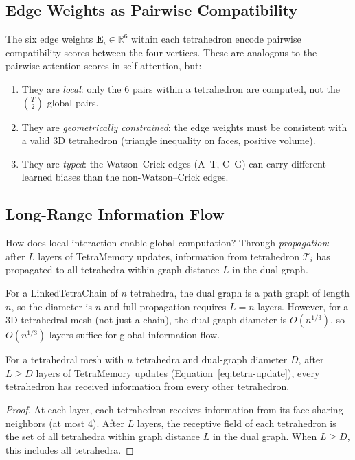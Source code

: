 \subsection{Edge Weights as Pairwise Compatibility}
\label{sec:edge-compatibility}

The six edge weights $\mathbf{E}_i \in \mathbb{R}^6$ within each tetrahedron
encode pairwise compatibility scores between the four vertices. These are
analogous to the pairwise attention scores in self-attention, but:

\begin{enumerate}[leftmargin=2em]
  \item They are \emph{local}: only the 6 pairs within a tetrahedron are
        computed, not the $\binom{T}{2}$ global pairs.
  \item They are \emph{geometrically constrained}: the edge weights must be
        consistent with a valid 3D tetrahedron (triangle inequality on faces,
        positive volume).
  \item They are \emph{typed}: the Watson--Crick edges (A--T, C--G) can carry
        different learned biases than the non-Watson--Crick edges.
\end{enumerate}

\subsection{Long-Range Information Flow}
\label{sec:long-range}

How does local interaction enable global computation? Through \emph{propagation}:
after $L$ layers of TetraMemory updates, information from tetrahedron
$\mathcal{T}_i$ has propagated to all tetrahedra within graph distance $L$ in
the dual graph.

For a LinkedTetraChain of $n$ tetrahedra, the dual graph is a path graph of
length $n$, so the diameter is $n$ and full propagation requires $L = n$ layers.
However, for a 3D tetrahedral mesh (not just a chain), the dual graph diameter
is $O(n^{1/3})$, so $O(n^{1/3})$ layers suffice for global information flow.

\begin{theorem}
\label{thm:propagation}
For a tetrahedral mesh with $n$ tetrahedra and dual-graph diameter $D$, after
$L \geq D$ layers of TetraMemory updates (Equation~\ref{eq:tetra-update}),
every tetrahedron has received information from every other tetrahedron.
\end{theorem}
\begin{proof}
At each layer, each tetrahedron receives information from its face-sharing
neighbors (at most 4). After $L$ layers, the receptive field of each
tetrahedron is the set of all tetrahedra within graph distance $L$ in the
dual graph. When $L \geq D$, this includes all tetrahedra.
\end{proof}

